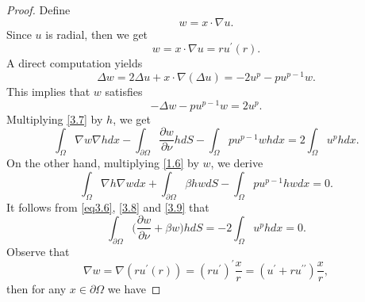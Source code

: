 \documentclass[12pt,reqno]{amsart}
\numberwithin{equation}{section}
\theoremstyle{definition}
\def\R{{\mathfrak R}}
\def\R{\Bbb R}
\begin{document}
\begin{proof}


Define 
$$
w=x\cdot\nabla u.
$$
Since $u$ is radial, then we get 
$$
w=x\cdot \nabla u=ru^\prime(r).
$$
A direct computation yields 
$$
\Delta w=2\Delta u+x\cdot \nabla (\Delta u)=-2u^p-pu^{p-1}w.
$$
This implies that $w$ satisfies 
\begin{equation}\label{3.7}
-\Delta w-pu^{p-1}w=2u^p.
\end{equation}
Multiplying \eqref{3.7} by $h$, we get
\begin{equation}\label{3.8}
\int_{\Omega}\nabla w\nabla hdx-\int_{\partial\Omega}\frac{\partial w}{\partial\nu}hdS-\int_{\Omega}pu^{p-1}whdx=2\int_{\Omega}u^phdx.
\end{equation}
On the other hand, multiplying \eqref{1.6} by $w$, we derive 
\begin{equation}\label{3.9}
\int_{\Omega}\nabla h\nabla wdx+\int_{\partial\Omega}\beta hwdS-\int_{\Omega}pu^{p-1}hwdx=0.
\end{equation}
It follows from \eqref{eq3.6}, \eqref{3.8} and \eqref{3.9} that 
\begin{equation}\label{3.10}
\int_{\partial\Omega}\Big(\frac{\partial w}{\partial\nu}+\beta w\Big)hdS=-2\int_{\Omega}u^phdx=0.
\end{equation}
Observe that 
$$
\nabla w=\nabla (ru^\prime(r))=(ru^\prime)^\prime\frac{x}{r}=(u^\prime+ru^{\prime\prime})\frac{x}{r},
$$
then for any $x\in\partial\Omega$ we have 

\end{proof}
\end{document}
